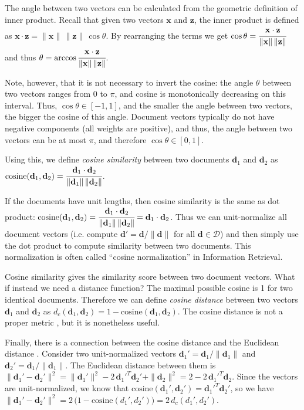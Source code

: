 The angle between two vectors can be calculated from the geometric
definition of inner product. Recall that given
two vectors $\mathbf x$ and $\mathbf z$, the inner product is defined as
$\mathbf x \cdot \mathbf z = \|\mathbf x \| \, \| \mathbf z \| \, \cos \theta$.
By rearranging the terms we get
$\cos \theta = \cfrac{\mathbf x \cdot \mathbf z}{\|\mathbf x \| \, \| \mathbf z \|}$
and thus
$\theta = \arccos \cfrac{\mathbf x \cdot \mathbf z}{\|\mathbf x \| \, \| \mathbf z \|}$.

Note, however, that it is not necessary to invert the cosine: the angle $\theta$
between two vectors ranges from $0$ to $\pi$, and cosine is monotonically
decreasing on this interval. Thus, $\cos \theta \in [-1, 1]$, and the smaller
the angle between two vectors, the bigger the cosine of this angle.
Document vectors typically do not have negative components (all weights are
positive), and thus, the angle between two vectors can be at most $\pi$,
and therefore $\cos \theta \in [0, 1]$.

Using this, we define \emph{cosine similarity} between two documents $\mathbf d_1$ and
$\mathbf d_2$ as
$\text{cosine}(\mathbf d_1, \mathbf d_2) = \cfrac{\mathbf d_1 \cdot \mathbf d_2}{\|\mathbf d_1 \| \, \| \mathbf d_2 \|}$.

If the documents have unit lengths, then cosine similarity is the same as
dot product: $\text{cosine}(\mathbf d_1, \mathbf d_2) = \cfrac{\mathbf d_1 \cdot \mathbf d_2}{\|\mathbf d_1 \| \, \| \mathbf d_2 \|} = \mathbf d_1 \cdot \mathbf d_2$.
Thus we can unit-normalize all document vectors
(i.e. compute $\mathbf d' = \mathbf d / \| \mathbf d \|$ for all
$\mathbf d \in \mathcal D$) and then simply use the dot product to compute
similarity between two documents. This normalization is often
called ``cosine normalization'' in Information Retrieval.


Cosine similarity gives the similarity score between two document vectors.
What if instead we need a distance function? The maximal possible cosine
is 1 for two identical documents. Therefore we can define \emph{cosine distance}
between two vectors $\mathbf d_1$ and $\mathbf d_2$ as
$d_c(\mathbf d_1, \mathbf d_2) = 1 - \text{cosine}(\mathbf d_1, \mathbf d_2)$.
The cosine distance is not a proper metric \cite{korenius2007principal},
but it is nonetheless useful.

Finally, there is a connection between the cosine distance and the Euclidean
distance \cite{korenius2007principal}.
Consider two unit-normalized vectors $\mathbf d_1' = \mathbf d_1 / \| \mathbf d_1 \|$ and
$\mathbf d_2' = \mathbf d_1 / \| \mathbf d_1 \|$.
The Euclidean distance between them is
$\| \mathbf d_1' - \mathbf d_2' \|^2 = \| \mathbf d_1' \|^2 - 2 \, \mathbf d_1'^T \mathbf d_2' + \| \mathbf d_2 \|^2 = 2 - 2 \, \mathbf d_1'^T \mathbf d_2$. Since the vectors are unit-normalized, we know that
$\text{cosine}(\mathbf d_1', \mathbf d_2') = \mathbf d_1'^T \mathbf d_2'$, so we have
$\| \mathbf d_1' - \mathbf d_2' \|^2 = 2 \, \big(1 - \text{cosine}(d_1', d_2')\big) = 2 \, d_c(d_1', d_2')$.


